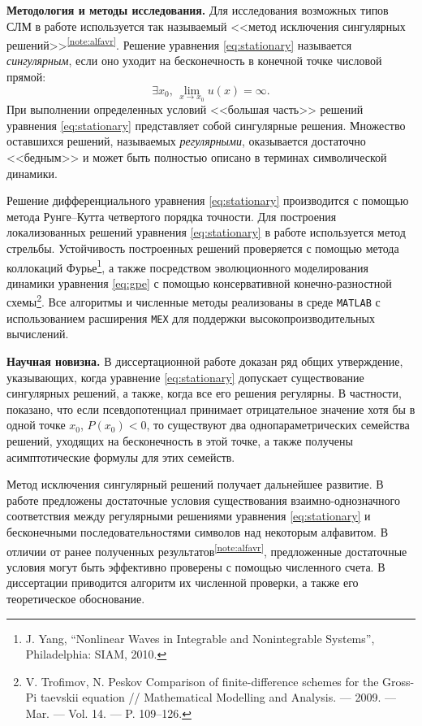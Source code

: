 \documentclass[candidate, href, colorlinks]{disser}
\begin{document}
\textbf{Методология и методы исследования.}
Для исследования возможных типов СЛМ в работе используется так называемый <<метод исключения сингулярных решений>>\textsuperscript{\ref{note:alfavr}}.
Решение уравнения \eqref{eq:stationary} называется {\it сингулярным}, если оно уходит на бесконечность в конечной точке числовой прямой:
\begin{equation}
	\exists x_0, \, \lim \limits_{x \to x_0} u(x) = \infty.
\end{equation}
При выполнении определенных условий <<большая часть>> решений уравнения \eqref{eq:stationary} представляет собой сингулярные решения.
Множество оставшихся решений, называемых {\it регулярными}, оказывается достаточно <<бедным>> и может быть полностью описано в терминах символической динамики.

Решение дифференциального уравнения \eqref{eq:stationary} производится с помощью метода Рунге--Кутта четвертого порядка точности.
Для построения локализованных решений уравнения \eqref{eq:stationary} в работе используется метод стрельбы.
Устойчивость построенных решений проверяется с помощью метода коллокаций Фурье\footnote{J. Yang, ``Nonlinear Waves in Integrable and Nonintegrable Systems'', Philadelphia: SIAM, 2010.}, а также посредством эволюционного моделирования динамики уравнения \eqref{eq:gpe} с помощью консервативной конечно-разностной схемы\footnote{V. Trofimov, N. Peskov Comparison of finite-difference schemes for the Gross-Pi­ taevskii equation // Mathematical Modelling and Analysis. — 2009. — Mar. — Vol. 14. — P. 109–126.}.
Все алгоритмы и численные методы реализованы в среде {\tt MATLAB} с использованием расширения {\tt MEX} для поддержки высокопроизводительных вычислений.

\textbf{Научная новизна.}
В диссертационной работе доказан ряд общих утверждение, указывающих, когда уравнение \eqref{eq:stationary} допускает существование сингулярных решений, а также, когда все его решения регулярны.
В частности, показано, что если псевдопотенциал принимает отрицательное значение хотя бы в одной точке $x_0$, $P(x_0) < 0$, то существуют два однопараметрических семейства решений, уходящих на бесконечность в этой точке, а также получены асимптотические формулы для этих семейств.

Метод исключения сингулярный решений получает дальнейшее развитие.
В работе предложены достаточные условия существования взаимно-однозначного соответствия между регулярными решениями уравнения \eqref{eq:stationary} и бесконечными последовательностями символов над некоторым алфавитом.
В отличии от ранее полученных результатов\textsuperscript{\ref{note:alfavr}}, предложенные достаточные условия могут быть эффективно проверены с помощью численного счета.
В диссертации приводится алгоритм их численной проверки, а также его теоретическое обоснование.
\end{document}

